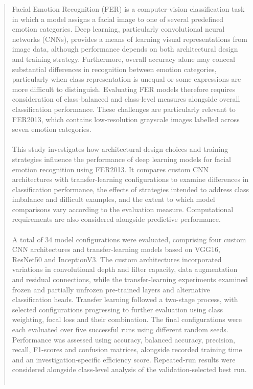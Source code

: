 \documentclass[12pt, a4paper]{report}
\begin{document}
	\begin{abstract}
		Facial Emotion Recognition (FER) is a computer-vision classification task in which a model assigns a facial image to one of several predefined emotion categories. Deep learning, particularly convolutional neural networks (CNNs), provides a means of learning visual representations from image data, although performance depends on both architectural design and training strategy. Furthermore, overall accuracy alone may conceal substantial differences in recognition between emotion categories, particularly when class representation is unequal or some expressions are more difficult to distinguish. Evaluating FER models therefore requires consideration of class-balanced and class-level measures alongside overall classification performance. These challenges are particularly relevant to FER2013, which contains low-resolution grayscale images labelled across seven emotion categories.\\\\
		This study investigates how architectural design choices and training strategies influence the performance of deep learning models for facial emotion recognition using FER2013. It compares custom CNN architectures with transfer-learning configurations to examine differences in classification performance, the effects of strategies intended to address class imbalance and difficult examples, and the extent to which model comparisons vary according to the evaluation measure. Computational requirements are also considered alongside predictive performance.\\\\
		A total of $34$ model configurations were evaluated, comprising four custom CNN architectures and transfer-learning models based on VGG16, ResNet50 and InceptionV3. The custom architectures incorporated variations in convolutional depth and filter capacity, data augmentation and residual connections, while the transfer-learning experiments examined frozen and partially unfrozen pre-trained layers and alternative classification heads. Transfer learning followed a two-stage process, with selected configurations progressing to further evaluation using class weighting, focal loss and their combination. The final configurations were each evaluated over five successful runs using different random seeds. Performance was assessed using accuracy, balanced accuracy, precision, recall, F1-scores and confusion matrices, alongside recorded training time and an investigation-specific efficiency score. Repeated-run results were considered alongside class-level analysis of the validation-selected best run.\\\\

\end{abstract}
\end{document}

